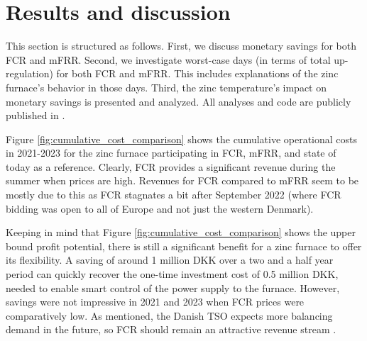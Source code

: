 \documentclass[sigconf]{acmart}
\begin{document}

\section{Results and discussion}

This section is structured as follows. First, we discuss monetary savings for both FCR and mFRR. Second, we investigate worst-case days (in terms of total up-regulation) for both FCR and mFRR. This includes explanations of the zinc furnace's behavior in those days. Third, the zinc temperature's impact on monetary savings is presented and analyzed. All analyses and code are publicly published in \cite{code}.

Figure \ref{fig:cumulative_cost_comparison} shows the cumulative operational costs in 2021-2023 for the zinc furnace participating in FCR, mFRR, and state of today as a reference. Clearly, FCR provides a significant revenue during the summer when prices are high. Revenues for FCR compared to mFRR seem to be mostly due to this as FCR stagnates a bit after September 2022 (where FCR bidding was open to all of Europe and not just the western Denmark).

Keeping in mind that Figure \ref{fig:cumulative_cost_comparison} shows the upper bound profit potential, there is still a significant benefit for a zinc furnace to offer its flexibility. A saving of around 1 million DKK over a two and a half year period can quickly recover the one-time investment cost of 0.5 million DKK, needed to enable smart control of the power supply to the furnace. However, savings were not impressive in 2021 and 2023 when FCR prices were comparatively low. As mentioned, the Danish TSO expects more balancing demand in the future, so FCR should remain an attractive revenue stream \cite{energinet:scenario_report_2022}.
\end{document}
